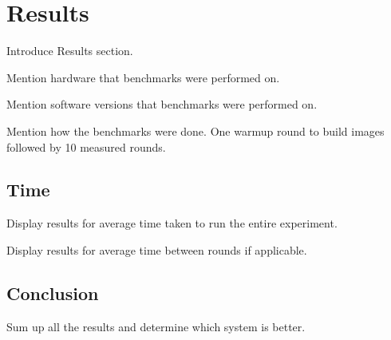 \section{Results}

Introduce Results section.

Mention hardware that benchmarks were performed on.

Mention software versions that benchmarks were performed on.

Mention how the benchmarks were done.
One warmup round to build images followed by 10 measured rounds.





\subsection{Time}

Display results for average time taken to run the entire experiment.

Display results for average time between rounds if applicable.



\subsection{Conclusion}

Sum up all the results and determine which system is better.
